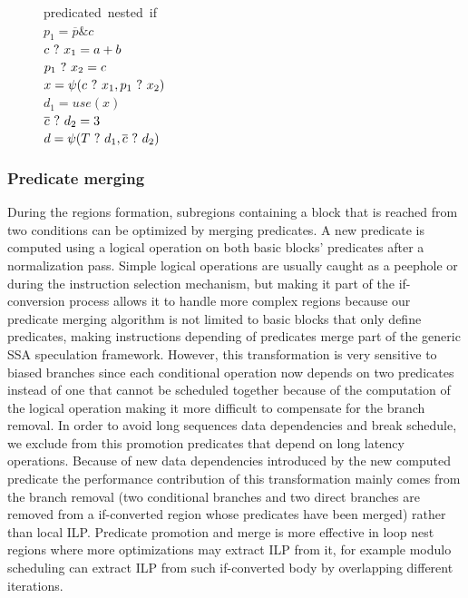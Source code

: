 \begin{figure}
\begin{minipage}[b]{4cm}
\mbox{predicated nested if} \\
$ p_1 = \overline{p} \& {c} $ \\
$ c ~?~ x_1 = a + b $ \\
$ p_1 ~?~ x_2 = c $ \\
$ x = \psi(c ~?~ x_1, p_1 ~?~ x_2) $ \\
$ d_1 = use (x) $ \\
$ \overline{c} ~?~ d_2 = 3 $ \\
$ d = \psi(T ~?~ d_1, \overline{c} ~?~ d_2) $ \\
\label{fig:nested_psi_predicated}
\end{minipage}
\end{figure}

\subsubsection{Predicate merging}

During the regions formation, subregions containing a block that is reached from two conditions can be optimized by merging predicates. A new predicate is computed using a logical operation on both basic blocks' predicates after a normalization pass. Simple logical operations are usually caught as a peephole or during the instruction selection mechanism, but making it part of the if-conversion process allows it to handle more complex regions because our predicate merging algorithm is not limited to basic blocks that only define predicates, making instructions depending of predicates merge part of the generic SSA speculation framework. However, this transformation is very sensitive to biased branches since each conditional operation now depends on two predicates instead of one that cannot be scheduled together because of the computation of the logical operation making it more difficult to compensate for the branch removal. In order to avoid long sequences data dependencies and break schedule, we exclude from this promotion predicates that depend on long latency operations.
Because of new data dependencies introduced by the new computed predicate the performance contribution of this transformation mainly comes from the branch removal (two conditional branches and two direct branches are removed from a if-converted region whose predicates have been merged) rather than local ILP. Predicate promotion and merge is more effective in loop nest regions where more optimizations may extract ILP from it, for example modulo scheduling can extract ILP from such if-converted body by overlapping different iterations. 

